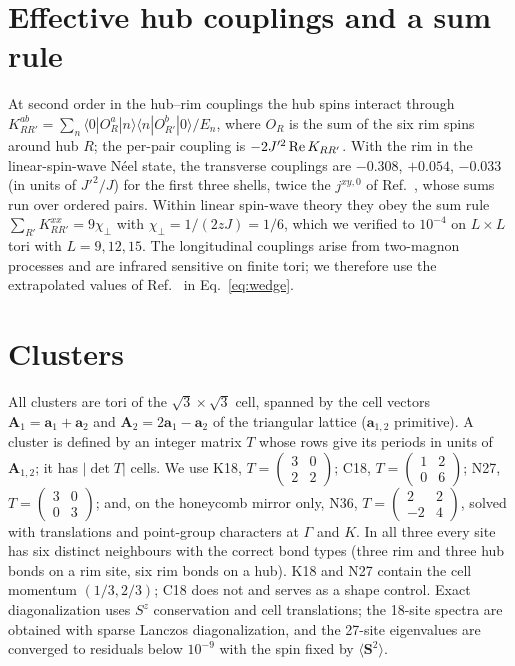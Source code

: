 \documentclass[prb,twocolumn,superscriptaddress,amsmath,amssymb,floatfix]{revtex4-2}
\begin{document}
\section{Effective hub couplings and a sum rule}
\label{app:hub}
At second order in the hub--rim couplings the hub spins interact through $K^{ab}_{RR'}=\sum_n\langle0|O^a_R|n\rangle\langle n|O^b_{R'}|0\rangle/E_n$, where $O_R$ is the sum of the six rim spins around hub $R$; the per-pair coupling is $-2J'^2\,{\rm Re}\,K_{RR'}$. With the rim in the linear-spin-wave N\'eel state, the transverse couplings are $-0.308$, $+0.054$, $-0.033$ (in units of $J'^2/J$) for the first three shells, twice the $j^{xy,0}$ of Ref.~\cite{SeifertVojta2019}, whose sums run over ordered pairs. Within linear spin-wave theory they obey the sum rule $\sum_{R'}K^{xx}_{RR'}=9\chi_\perp$ with $\chi_\perp=1/(2zJ)=1/6$, which we verified to $10^{-4}$ on $L\times L$ tori with $L=9,12,15$. The longitudinal couplings arise from two-magnon processes and are infrared sensitive on finite tori; we therefore use the extrapolated values of Ref.~\cite{SeifertVojta2019} in Eq.~\eqref{eq:wedge}.

\section{Clusters}
\label{app:clusters}
All clusters are tori of the $\sqrt3\times\sqrt3$ cell, spanned by the cell vectors $\mathbf A_1=\mathbf a_1+\mathbf a_2$ and $\mathbf A_2=2\mathbf a_1-\mathbf a_2$ of the triangular lattice ($\mathbf a_{1,2}$ primitive). A cluster is defined by an integer matrix $T$ whose rows give its periods in units of $\mathbf A_{1,2}$; it has $|\det T|$ cells. We use K18, $T=\left(\begin{smallmatrix}3&0\\2&2\end{smallmatrix}\right)$; C18, $T=\left(\begin{smallmatrix}1&2\\0&6\end{smallmatrix}\right)$; N27, $T=\left(\begin{smallmatrix}3&0\\0&3\end{smallmatrix}\right)$; and, on the honeycomb mirror only, N36, $T=\left(\begin{smallmatrix}2&2\\-2&4\end{smallmatrix}\right)$, solved with translations and point-group characters at $\Gamma$ and $K$. In all three every site has six distinct neighbours with the correct bond types (three rim and three hub bonds on a rim site, six rim bonds on a hub). K18 and N27 contain the cell momentum $(1/3,2/3)$; C18 does not and serves as a shape control. Exact diagonalization uses $S^z$ conservation and cell translations; the 18-site spectra are obtained with sparse Lanczos diagonalization, and the 27-site eigenvalues are converged to residuals below $10^{-9}$ with the spin fixed by $\langle\mathbf S^2\rangle$.


\end{document}
